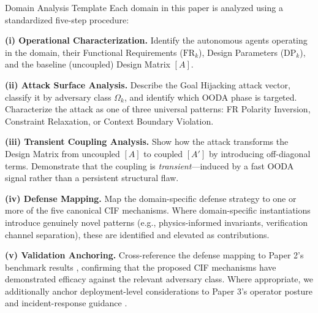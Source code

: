 \documentclass[
  ignorenonframetext,
]{beamer}
\begin{document}
\begin{frame}[allowframebreaks]{Domain Analysis Template}
\protect{}\label{domain-analysis-template}
Each domain in this paper is analyzed using a standardized five-step
procedure:

\textbf{(i) Operational Characterization.} Identify the autonomous
agents operating in the domain, their Functional Requirements
(\(\text{FR}_k\)), Design Parameters (\(\text{DP}_k\)), and the baseline
(uncoupled) Design Matrix \([A]\).

\textbf{(ii) Attack Surface Analysis.} Describe the Goal Hijacking
attack vector, classify it by adversary class \(\Omega_k\), and identify
which OODA phase is targeted. Characterize the attack as one of three
universal patterns: FR Polarity Inversion, Constraint Relaxation, or
Context Boundary Violation.

\textbf{(iii) Transient Coupling Analysis.} Show how the attack
transforms the Design Matrix from uncoupled \([A]\) to coupled \([A']\)
by introducing off-diagonal terms. Demonstrate that the coupling is
\emph{transient}---induced by a fast OODA signal rather than a
persistent structural flaw.

\textbf{(iv) Defense Mapping.} Map the domain-specific defense strategy
to one or more of the five canonical CIF mechanisms. Where
domain-specific instantiations introduce genuinely novel patterns (e.g.,
physics-informed invariants, verification channel separation), these are
identified and elevated as contributions.

\textbf{(v) Validation Anchoring.} Cross-reference the defense mapping
to Paper 2's benchmark results \cite{friedman2026cogsec2}, confirming
that the proposed CIF mechanisms have demonstrated efficacy against the
relevant adversary class. Where appropriate, we additionally anchor
deployment-level considerations to Paper 3's operator posture and
incident-response guidance \cite{friedman2026cogsec3}.
\end{frame}
\end{document}
